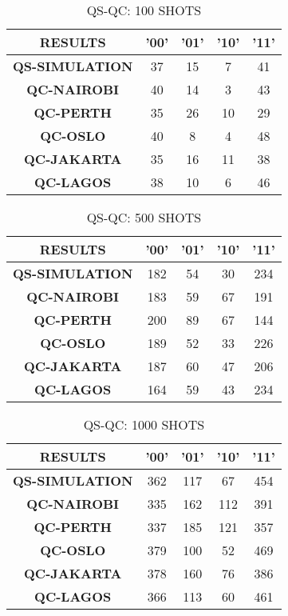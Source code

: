 \begin{table}[!ht]
    \centering
    \begin{tabular}{ccccc}
    \hline
        \textbf{RESULTS} & \textbf{'00'} & \textbf{'01'} & \textbf{'10'} & \textbf{'11' } \\ \hline
        \textbf{QS-SIMULATION} & 37 & 15 & 7 & 41  \\ 
        \textbf{QC-NAIROBI} & 40 & 14 & 3 & 43  \\ 
        \textbf{QC-PERTH} & 35 & 26 & 10 & 29  \\ 
        \textbf{QC-OSLO} & 40 & 8 & 4 & 48  \\ 
        \textbf{QC-JAKARTA} & 35 & 16 & 11 & 38  \\ 
        \textbf{QC-LAGOS} & 38 & 10 & 6 & 46 \\ \hline
    \end{tabular}
    \caption{QS-QC: 100 SHOTS}
\end{table}

\begin{table}[!ht]
    \centering
    \begin{tabular}{ccccc}
    \hline
        \textbf{RESULTS} & \textbf{'00'} & \textbf{'01'} & \textbf{'10'} & \textbf{'11' } \\ \hline
        \textbf{QS-SIMULATION} & 182 & 54 & 30 & 234  \\ 
        \textbf{QC-NAIROBI} & 183 & 59 & 67 & 191  \\ 
        \textbf{QC-PERTH} & 200 & 89 & 67 & 144  \\ 
        \textbf{QC-OSLO} & 189 & 52 & 33 & 226  \\ 
        \textbf{QC-JAKARTA} & 187 & 60 & 47 & 206  \\ 
        \textbf{QC-LAGOS} & 164 & 59 & 43 & 234 \\ \hline
    \end{tabular}
    \caption{QS-QC: 500 SHOTS}
\end{table}

\begin{table}[!ht]
    \centering
    \begin{tabular}{ccccc}
    \hline
        \textbf{RESULTS} & \textbf{'00'} & \textbf{'01'} & \textbf{'10'} & \textbf{'11' } \\ \hline
        \textbf{QS-SIMULATION} & 362 & 117 & 67 & 454  \\ 
        \textbf{QC-NAIROBI} & 335 & 162 & 112 & 391  \\ 
        \textbf{QC-PERTH} & 337 & 185 & 121 & 357  \\ 
        \textbf{QC-OSLO} & 379 & 100 & 52 & 469  \\ 
        \textbf{QC-JAKARTA} & 378 & 160 & 76 & 386  \\ 
        \textbf{QC-LAGOS} & 366 & 113 & 60 & 461 \\ \hline
    \end{tabular}
    \caption{QS-QC: 1000 SHOTS}
\end{table}


